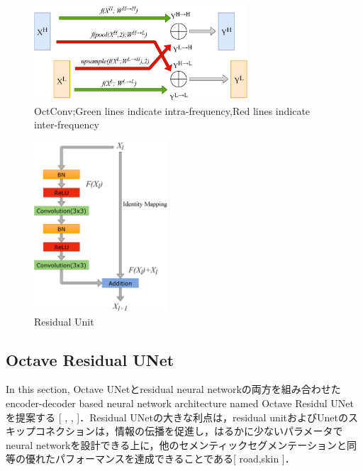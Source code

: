 \documentclass{article}
\begin{document}
\begin{figure}[t]
\begin{center}
\includegraphics[width=80mm]{fig1.eps}
\caption{OctConv;Green lines indicate intra-frequency,Red lines indicate inter-frequency }
\end{center}
\end{figure}

\begin{figure}[t]
\begin{center}
\includegraphics[width=50mm]{fig2.eps}
\caption{Residual Unit}
\end{center}
\end{figure}

\subsection{Octave Residual UNet}
In this section, Octave UNetとresidual neural networkの両方を組み合わせたencoder-decoder based neural network architecture named Octave Residul UNetを提案する [ , , ]．Residual UNetの大きな利点は，residual unitおよびUnetのスキップコネクションは，情報の伝播を促進し，はるかに少ないパラメータでneural networkを設計できる上に，他のセメンティックセグメンテーションと同等の優れたパフォーマンスを達成できることである[ road,skin ]．
\end{document}
